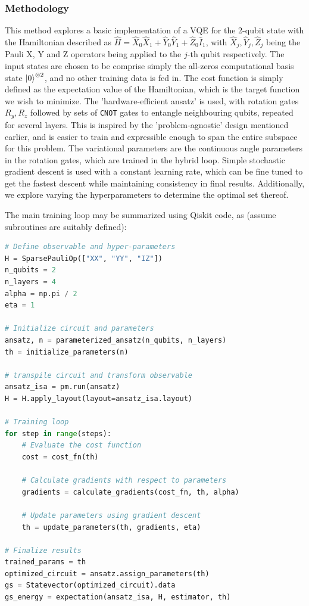 \documentclass[11pt,a4paper]{article}
\begin{document}
\subsubsection{Methodology}

This method explores a basic implementation of a VQE for the 2-qubit state with the Hamiltonian described as $\hat{H} = \hat{X}_0 \hat{X}_1 + \hat{Y}_0 \hat{Y}_1 + \hat{Z}_0 \hat{I}_1$, with $\hat{X}_j, \hat{Y}_j, \hat{Z}_j$ being the Pauli X, Y and Z operators being applied to the $j$-th qubit respectively. The input states are chosen to be comprise simply the all-zeros computational basis state $\ket{0}^{\otimes 2}$, and no other training data is fed in. The cost function is simply defined as the expectation value of the Hamiltonian, which is the target function we wish to minimize. The 'hardware-efficient ansatz' is used, with rotation gates $R_y, R_z$ followed by sets of \texttt{CNOT} gates to entangle neighbouring qubits, repeated for several layers. This is inspired by the 'problem-agnostic' design mentioned earlier, and is easier to train and expressible enough to span the entire subspace for this problem. The variational parameters are the continuous angle parameters in the rotation gates, which are trained in the hybrid loop. Simple stochastic gradient descent is used with a constant learning rate, which can be fine tuned to get the fastest descent while maintaining consistency in final results. Additionally, we explore varying the hyperparameters to determine the optimal set thereof.

The main training loop may be summarized using Qiskit code, as (assume subroutines are suitably defined):

\begin{lstlisting}[language=Python]
# Define observable and hyper-parameters
H = SparsePauliOp(["XX", "YY", "IZ"])
n_qubits = 2
n_layers = 4
alpha = np.pi / 2
eta = 1

# Initialize circuit and parameters
ansatz, n = parameterized_ansatz(n_qubits, n_layers)
th = initialize_parameters(n)

# transpile circuit and transform observable
ansatz_isa = pm.run(ansatz)
H = H.apply_layout(layout=ansatz_isa.layout)

# Training loop
for step in range(steps):
    # Evaluate the cost function
    cost = cost_fn(th)
    
    # Calculate gradients with respect to parameters
    gradients = calculate_gradients(cost_fn, th, alpha)
    
    # Update parameters using gradient descent
    th = update_parameters(th, gradients, eta)
    
# Finalize results
trained_params = th
optimized_circuit = ansatz.assign_parameters(th)
gs = Statevector(optimized_circuit).data
gs_energy = expectation(ansatz_isa, H, estimator, th)
\end{lstlisting}
\end{document}
